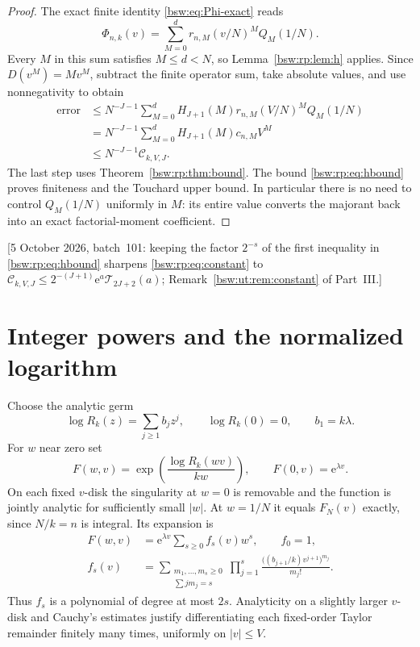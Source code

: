 \documentclass[11pt,letterpaper]{article}
\theoremstyle{definition}
\theoremstyle{remark}
\newcommand{\ee}{\mathrm e}
\begin{document}
\begin{proof}
The exact finite identity \eqref{bsw:eq:Phi-exact} reads
\[
 \Phi_{n,k}(v)=\sum_{M=0}^d r_{n,M}(v/N)^M Q_M(1/N).
\]
Every $M$ in this sum satisfies $M\le d<N$, so Lemma~\ref{bsw:rp:lem:h}
applies.  Since $D(v^M)=Mv^M$, subtract the finite operator sum, take
absolute values, and use nonnegativity to obtain
\begin{align*}
 \text{error}
 &\le N^{-J-1}\sum_{M=0}^d H_{J+1}(M)r_{n,M}(V/N)^M Q_M(1/N)\\
 &=N^{-J-1}\sum_{M=0}^d H_{J+1}(M)c_{n,M}V^M\\
 &\le N^{-J-1}\mathcal C_{k,V,J}.
\end{align*}
The last step uses Theorem~\ref{bsw:rp:thm:bound}.  The bound
\eqref{bsw:rp:eq:hbound} proves finiteness and the Touchard upper bound.
In particular there is no need to control $Q_M(1/N)$ uniformly in $M$: its
entire value converts the majorant back into an exact factorial-moment
coefficient.
\end{proof}

[5 October 2026, batch~101: keeping the factor $2^{-s}$ of the first
inequality in \eqref{bsw:rp:eq:hbound} sharpens \eqref{bsw:rp:eq:constant}
to $\mathcal C_{k,V,J}\le2^{-(J+1)}\ee^a\mathcal T_{2J+2}(a)$;
Remark~\ref{bsw:ut:rem:constant} of Part~III.]

\section{Integer powers and the normalized logarithm}\label{bsw:rp:sec:integer}

Choose the analytic germ
\[
 \log R_k(z)=\sum_{j\ge1}b_jz^j,\qquad \log R_k(0)=0,
 \qquad b_1=k\lambda.
\]
For $w$ near zero set
\begin{equation}\label{bsw:rp:eq:Fwv}
 F(w,v)=\exp\left(\frac{\log R_k(wv)}{kw}\right),
 \qquad F(0,v)=\ee^{\lambda v}.
\end{equation}
On each fixed $v$-disk the singularity at $w=0$ is removable and the
function is jointly analytic for sufficiently small $|w|$.  At $w=1/N$ it
equals $F_N(v)$ exactly, since $N/k=n$ is integral.  Its expansion is
\begin{align}
 F(w,v)&=\ee^{\lambda v}\sum_{s\ge0}f_s(v)w^s,\qquad f_0=1,
 \label{bsw:rp:eq:f}\\
 f_s(v)&=\sum_{\substack{m_1,\ldots,m_s\ge0\\\sum j m_j=s}}
 \prod_{j=1}^s\frac{\bigl((b_{j+1}/k)v^{j+1}\bigr)^{m_j}}{m_j!}.
 \label{bsw:rp:eq:fs}
\end{align}
Thus $f_s$ is a polynomial of degree at most $2s$.  Analyticity on a
slightly larger $v$-disk and Cauchy's estimates justify differentiating each
fixed-order Taylor remainder finitely many times, uniformly on $|v|\le V$.
\end{document}
